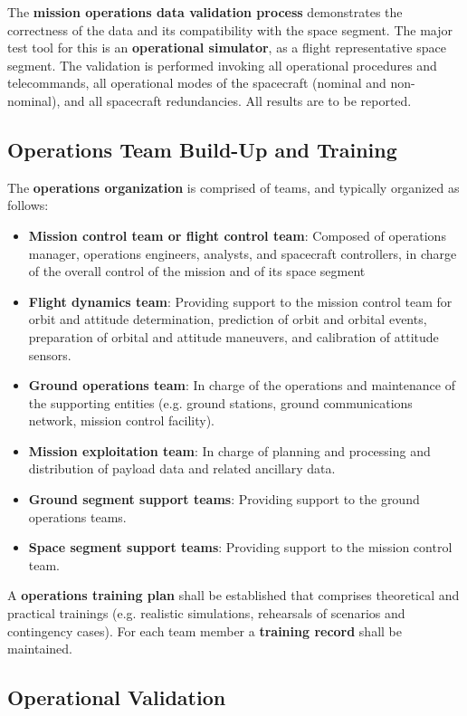 The \textbf{mission operations data validation process} demonstrates the correctness of the data and its compatibility with the space segment. The major test tool for this is an \textbf{operational simulator}, as a flight representative space segment. The validation is performed invoking all operational procedures and telecommands, all operational modes of the spacecraft (nominal and non-nominal), and all spacecraft redundancies. All results are to be reported.

\subsection{Operations Team Build-Up and Training}

The \textbf{operations organization} is comprised of teams, and typically organized as follows:
 
\begin{itemize}
\item \textbf{Mission control team or flight control team}: Composed of operations manager, operations engineers, analysts, and spacecraft controllers, in charge of the overall control of the mission and of its space segment
\item \textbf{Flight dynamics team}: Providing support to the mission control team for orbit and attitude determination, prediction of orbit and orbital events, preparation of orbital and attitude maneuvers, and calibration of attitude sensors.
\item \textbf{Ground operations team}: In charge of the operations and maintenance of the supporting entities (e.g. ground stations, ground communications network, mission control facility).
\item \textbf{Mission exploitation team}: In charge of planning and processing and distribution of payload data and related ancillary data.
\item \textbf{Ground segment support teams}: Providing support to the ground operations teams.
\item \textbf{Space segment support teams}: Providing support to the mission control team.
\end{itemize}

A \textbf{operations training plan} shall be established that comprises theoretical and practical trainings (e.g. realistic simulations, rehearsals of scenarios and contingency cases). For each team member a \textbf{training record} shall be maintained.

\subsection{Operational Validation}
\label{sec:Operational Validation}

